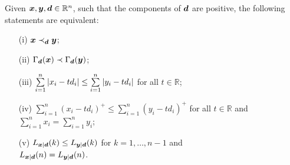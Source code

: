 \begin{proposition}\label{prop:dmajor}
Given $\bm{x}, \bm{y}, \bm{d} \in \mathbb{R}^n$, such that the components of $\bm{d}$ are positive, the following statements are equivalent:
  \begin{enumerate}
    \item[(i)] $\bm{x} \prec_{\bm{d}} \bm{y}$;
    \item[(ii)] $\Gamma_{\bm{d}}({\bm{x}}) \prec \Gamma_{\bm{d}}({\bm{y}})$;
    \item[(iii)]\label{en:tm3} $\sum\limits_{i=1}^n \abs{x_i - t d_i} \leq \sum\limits_{i=1}^n \abs{y_i - t d_i}$ for all $t \in \mathbb{R}$;
    \item[(iv)] $\sum\limits_{i=1}^n (x_i - t d_i)^+ \leq \sum\limits_{i=1}^n (y_i - t d_i)^+$ for all $t \in \mathbb{R}$ and \vspace{5pt}\\ $\sum\limits_{i=1}^n x_i = \sum\limits_{i=1}^n y_i$;
    \item[(v)] $L_{\bm{x}|\bm{d}}(k) \leq L_{\bm{y}|\bm{d}}(k)$ for $k=1,\dots,n-1$	 and \vspace{5pt}\\ $L_{\bm{x}|\bm{d}}(n) = L_{\bm{y}|\bm{d}}(n)$.
  \end{enumerate}
\end{proposition}
